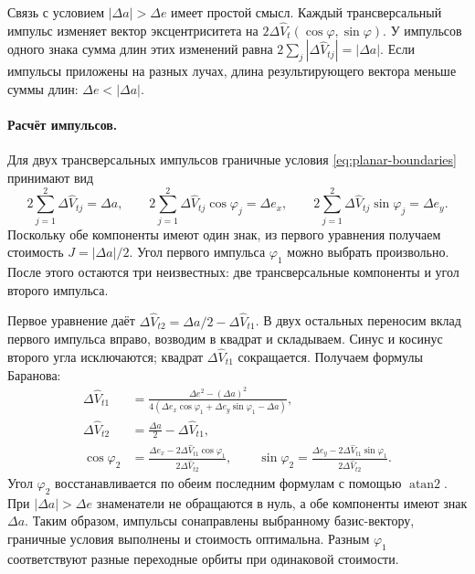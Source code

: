 Связь с условием $|\Delta a|>\Delta e$ имеет простой смысл.
Каждый трансверсальный импульс изменяет вектор эксцентриситета
на $2\Delta\widehat V_t(\cos\varphi,\sin\varphi)$.
У импульсов одного знака сумма длин этих изменений равна
$2\sum_j|\Delta\widehat V_{tj}|=|\Delta a|$.
Если импульсы приложены на разных лучах, длина результирующего
вектора меньше суммы длин: $\Delta e<|\Delta a|$.



\paragraph{Расчёт импульсов.}
Для двух трансверсальных импульсов граничные условия
\eqref{eq:planar-boundaries} принимают вид
\[
 2\sum_{j=1}^{2}\Delta\widehat V_{tj}=\Delta a,\qquad
 2\sum_{j=1}^{2}\Delta\widehat V_{tj}\cos\varphi_j=\Delta e_x,\qquad
 2\sum_{j=1}^{2}\Delta\widehat V_{tj}\sin\varphi_j=\Delta e_y.
\]
Поскольку обе компоненты имеют один знак, из первого уравнения получаем стоимость
$J=|\Delta a|/2$. Угол первого импульса $\varphi_1$ можно выбрать
произвольно. После этого остаются
три неизвестных: две трансверсальные компоненты и угол второго импульса.

Первое уравнение даёт
$\Delta\widehat V_{t2}=\Delta a/2-\Delta\widehat V_{t1}$.
В двух остальных переносим вклад первого импульса вправо,
возводим в квадрат и складываем. Синус и косинус второго угла
исключаются; квадрат $\Delta\widehat V_{t1}$ сокращается.
Получаем формулы Баранова:
\begin{equation}
\begin{aligned}
 \Delta\widehat V_{t1}&=
 \frac{\Delta e^2-(\Delta a)^2}
 {4(\Delta e_x\cos\varphi_1+\Delta e_y\sin\varphi_1-\Delta a)},\\
 \Delta\widehat V_{t2}&=\frac{\Delta a}{2}-\Delta\widehat V_{t1},\\
 \cos\varphi_2&=\frac{\Delta e_x-2\Delta\widehat V_{t1}\cos\varphi_1}
                         {2\Delta\widehat V_{t2}},\qquad
 \sin\varphi_2=\frac{\Delta e_y-2\Delta\widehat V_{t1}\sin\varphi_1}
                         {2\Delta\widehat V_{t2}}.
\end{aligned}
\label{eq:planar-free-first}
\end{equation}
Угол $\varphi_2$ восстанавливается по обеим последним формулам
с помощью $\operatorname{atan2}$.
При $|\Delta a|>\Delta e$ знаменатели не обращаются в нуль,
а обе компоненты имеют знак $\Delta a$.
Таким образом, импульсы сонаправлены выбранному базис-вектору,
граничные условия выполнены и стоимость оптимальна.
Разным $\varphi_1$ соответствуют разные переходные орбиты при одинаковой стоимости.

